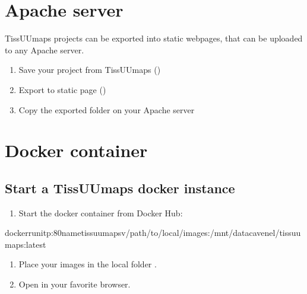 \documentclass[letterpaper,10pt,english,openany,oneside]{sphinxmanual}
\begin{document}
\section{Apache server}
\label{\detokenize{docs/sharing/apache:apache-server}}\label{\detokenize{docs/sharing/apache::doc}}
\sphinxAtStartPar
TissUUmaps projects can be exported into static webpages, that can be uploaded to any Apache server.
\begin{enumerate}
%
\item {} 
\sphinxAtStartPar
Save your project from TissUUmaps ()

\item {} 
\sphinxAtStartPar
Export to static page ()

\item {} 
\sphinxAtStartPar
Copy the exported folder on your Apache server

\end{enumerate}

\sphinxstepscope


\section{Docker container}
\label{\detokenize{docs/sharing/docker:docker-container}}\label{\detokenize{docs/sharing/docker::doc}}

\subsection{Start a TissUUmaps docker instance}
\label{\detokenize{docs/sharing/docker:start-a-tissuumaps-docker-instance}}\begin{enumerate}
%
\item {} 
\sphinxAtStartPar
Start the docker container  from Docker Hub:

\end{enumerate}

\begin{sphinxVerbatim}[commandchars=\\\{\}]
dockerrun\PYGZhy{}it\PYGZhy{}p:80\PYGZhy{}\PYGZhy{}nametissuumaps\PYGZhy{}v/path/to/local/images:/mnt/datacavenel/tissuumaps:latest
\end{sphinxVerbatim}
\begin{enumerate}
%
\item {} 
\sphinxAtStartPar
Place your images in the local folder .

\item {} 
\sphinxAtStartPar
Open  in your favorite browser.

\end{enumerate}
\end{document}

